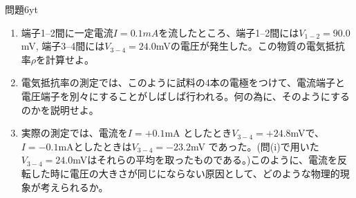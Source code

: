 \documentclass[fleqn]{jbook}
\begin{document}
\begin{question}{問題6}{yt}
\begin{enumerate}
\begin{enumerate}
\item 端子1--2間に一定電流$I=0.1 mA$を流したところ、端子1--2間には$V_{1-2}=90.0$mV, 端子3--4間には$V_{3-4}=24.0$mVの電圧が発生した。この物質の電気抵抗率$\rho$を計算せよ。
\item 電気抵抗率の測定では、このように試料の4本の電極をつけて、電流端子と電圧端子を別々にすることがしばしば行われる。何の為に、そのようにするのかを説明せよ。
\item 実際の測定では、電流を$I=+0.1$mA としたとき$V_{3-4}=+24.8$mVで、
$I=-0.1$mAとしたときは$V_{3-4}=-23.2$mV であった。(問(i)で用いた$V_{3-4}=24.0$mVはそれらの平均を取ったものである。)このように、電流を反転した時に電圧の大きさが同じにならない原因として、どのような物理的現象が考えられるか。
\end{enumerate}
\end{enumerate}
\begin{center}

\end{center}
\end{question}
\end{document}

